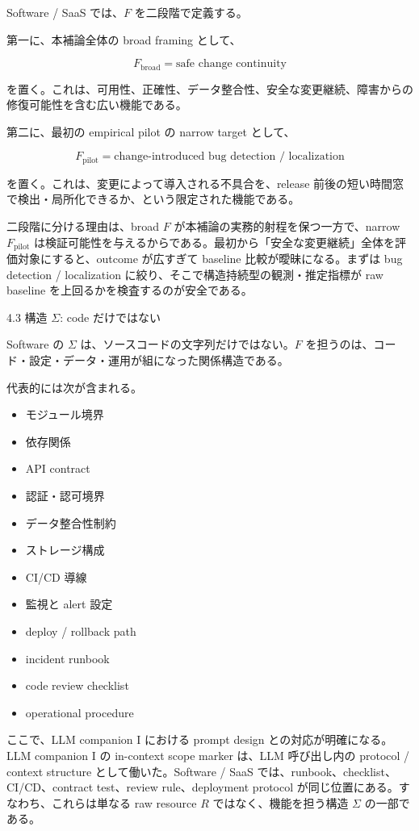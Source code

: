 \documentclass[12pt,a4paper]{article}
\begin{document}
Software / SaaS では、\(F\) を二段階で定義する。

第一に、本補論全体の broad framing として、

\[
F_{\mathrm{broad}} = \text{safe change continuity}
\]

を置く。これは、可用性、正確性、データ整合性、安全な変更継続、障害からの修復可能性を含む広い機能である。

第二に、最初の empirical pilot の narrow target として、

\[
F_{\mathrm{pilot}} = \text{change-introduced bug detection / localization}
\]

を置く。これは、変更によって導入される不具合を、release 前後の短い時間窓で検出・局所化できるか、という限定された機能である。

二段階に分ける理由は、broad \(F\) が本補論の実務的射程を保つ一方で、narrow \(F_{\mathrm{pilot}}\) は検証可能性を与えるからである。最初から「安全な変更継続」全体を評価対象にすると、outcome が広すぎて baseline 比較が曖昧になる。まずは bug detection / localization に絞り、そこで構造持続型の観測・推定指標が raw baseline を上回るかを検査するのが安全である。

4.3 構造 \(\Sigma\): code だけではない

Software の \(\Sigma\) は、ソースコードの文字列だけではない。\(F\) を担うのは、コード・設定・データ・運用が組になった関係構造である。

代表的には次が含まれる。

\begin{itemize}
\tightlist
\item
  モジュール境界
\item
  依存関係
\item
  API contract
\item
  認証・認可境界
\item
  データ整合性制約
\item
  ストレージ構成
\item
  CI/CD 導線
\item
  監視と alert 設定
\item
  deploy / rollback path
\item
  incident runbook
\item
  code review checklist
\item
  operational procedure
\end{itemize}

ここで、LLM companion I における prompt design との対応が明確になる。LLM companion I の in-context scope marker は、LLM 呼び出し内の protocol / context structure として働いた。Software / SaaS では、runbook、checklist、CI/CD、contract test、review rule、deployment protocol が同じ位置にある。すなわち、これらは単なる raw resource \(R\) ではなく、機能を担う構造 \(\Sigma\) の一部である。
\end{document}
